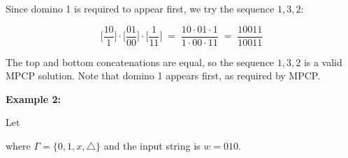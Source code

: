 \documentclass[12pt,a4paper,openany]{article}
\begin{document}
Since domino 1 is required to appear first, we try the sequence $1, 3, 2$:

\[
  \bigg[\frac{10}{1}\bigg]
  \cdot
  \bigg[\frac{01}{00}\bigg]
  \cdot
  \bigg[\frac{1}{11}\bigg]
  \;=\;
  \frac{10 \cdot 01 \cdot 1}{1 \cdot 00 \cdot 11}
  \;=\;
  \frac{10011}{10011}
\]

The top and bottom concatenations are equal, so the sequence $1, 3, 2$ is a valid MPCP solution.
Note that domino 1 appears first, as required by MPCP.


\textbf{Example 2:}

Let

\begin{center}
\end{center}

where $\Gamma = \{0, 1, x, \triangle\}$ and the input string is $w = 010$.
\end{document}
